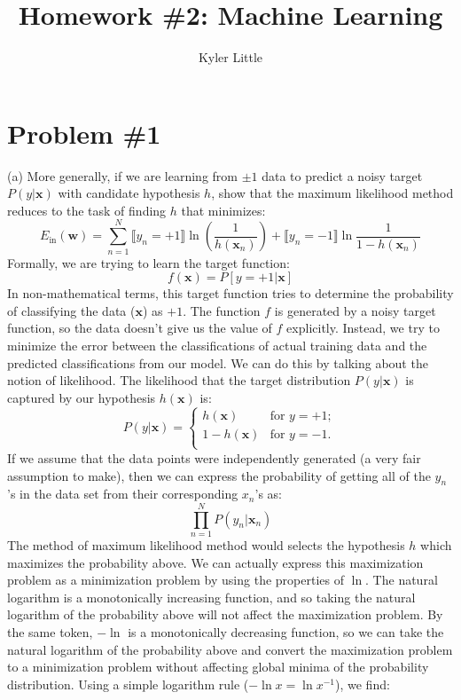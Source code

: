 \documentclass[12pt]{article}
\author{Kyler Little}
\title{Homework \#2: Machine Learning}
\begin{document}
	\maketitle
	\section*{Problem \#1}
	(a) More generally, if we are learning from $\pm1$ data to predict a noisy target $P({y|\boldsymbol{x}})$ with candidate hypothesis $h$, show that the maximum likelihood method reduces to the task of finding $h$ that minimizes:
	\begin{equation*}
	E_{\text{in}}(\boldsymbol{w})= \sum_{n=1}^{N} \llbracket y_n=+1\rrbracket \ln(\frac{1}{h(\boldsymbol{x}_n)}) + \llbracket y_n=-1\rrbracket \ln \frac{1}{1-h(\boldsymbol{x}_n)}
	\end{equation*}
	Formally, we are trying to learn the target function:
	\begin{equation*}
	f(\boldsymbol{x}) = P[y=+1|\boldsymbol{x}]
	\end{equation*} 
	In non-mathematical terms, this target function tries to determine the probability of classifying the data ($\boldsymbol{x}$) as $+1$. The function $f$ is generated by a noisy target function, so the data doesn't give us the value of $f$ explicitly. Instead, we try to minimize the error between the classifications of actual training data and the predicted classifications from our model. We can do this by talking about the notion of likelihood. The likelihood that the target distribution $P(y|\boldsymbol{x})$ is captured by our hypothesis $h(\boldsymbol{x})$ is:
	\begin{equation*}
	P(y|\boldsymbol{x}) = 
	\begin{cases}
	h(\boldsymbol{x}) & \text{for } y=+1; \\
	1-h(\boldsymbol{x}) & \text{for } y=-1. \\
	\end{cases}
	\end{equation*}
	If we assume that the data points were independently generated (a very fair assumption to make), then we can express the probability of getting all of the $y_n$'s in the data set from their corresponding $x_n$'s as:
	\begin{equation*}
	\prod_{n=1}^{N} P(y_n|\boldsymbol{x}_n) 
	\end{equation*}
	The method of maximum likelihood method would selects the hypothesis $h$ which maximizes the probability above. We can actually express this maximization problem as a minimization problem by using the properties of $\ln$. The natural logarithm is a monotonically increasing function, and so taking the natural logarithm of the probability above will not affect the maximization problem. By the same token, $-\ln$ is a monotonically decreasing function, so we can take the natural logarithm of the probability above and convert the maximization problem to a minimization problem without affecting global minima of the probability distribution. Using a simple logarithm rule ($-\ln x =\ln x^{-1}$), we find:
\end{document}
